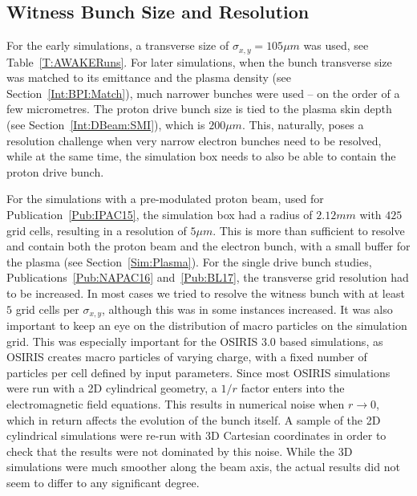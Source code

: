 \subsection{Witness Bunch Size and Resolution}
\label{Sim:EBeam:SizeRes}

For the early simulations, a transverse size of $\sigma_{x,y}=105\unit{\mu m}$ was used, see Table~\ref{T:AWAKERuns}.
For later simulations, when the bunch transverse size was matched to its emittance and the plasma density (see Section~\ref{Int:BPI:Match}), much narrower bunches were used -- on the order of a few micrometres.
The proton drive bunch size is tied to the plasma skin depth (see Section~\ref{Int:DBeam:SMI}), which is $200\unit{\mu m}$.
This, naturally, poses a resolution challenge when very narrow electron bunches need to be resolved, while at the same time, the simulation box needs to also be able to contain the proton drive bunch.

For the simulations with a pre-modulated proton beam, used for Publication~\ref{Pub:IPAC15}, the simulation box had a radius of $2.12\unit{mm}$ with $425$ grid cells, resulting in a resolution of $5\unit{\mu m}$.
This is more than sufficient to resolve and contain both the proton beam and the electron bunch, with a small buffer for the plasma (see Section~\ref{Sim:Plasma}).
For the single drive bunch studies, Publications~\ref{Pub:NAPAC16} and~\ref{Pub:BL17}, the transverse grid resolution had to be increased.
In most cases we tried to resolve the witness bunch with at least $5$ grid cells per $\sigma_{x,y}$, although this was in some instances increased.
It was also important to keep an eye on the distribution of macro particles on the simulation grid.
This was especially important for the OSIRIS 3.0 based simulations, as OSIRIS creates macro particles of varying charge, with a fixed number of particles per cell defined by input parameters.
Since most OSIRIS simulations were run with a 2D cylindrical geometry, a $1/r$ factor enters into the electromagnetic field equations.
This results in numerical noise when $r \to 0$, which in return affects the evolution of the bunch itself.
A sample of the 2D cylindrical simulations were re-run with 3D Cartesian coordinates in order to check that the results were not dominated by this noise.
While the 3D simulations were much smoother along the beam axis, the actual results did not seem to differ to any significant degree.

